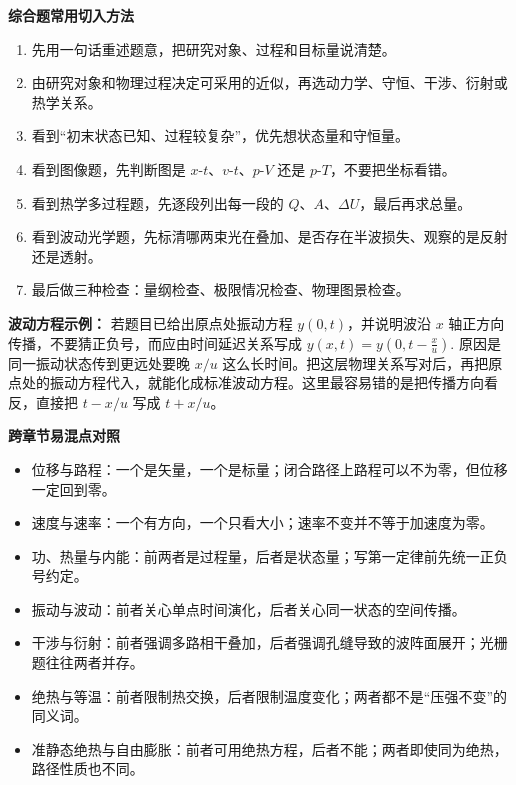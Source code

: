 \documentclass[lang=cn,11pt]{elegantbook}
\begin{document}
\textbf{综合题常用切入方法}

\begin{enumerate}
 \item 先用一句话重述题意，把研究对象、过程和目标量说清楚。
 \item 由研究对象和物理过程决定可采用的近似，再选动力学、守恒、干涉、衍射或热学关系。
 \item 看到“初末状态已知、过程较复杂”，优先想状态量和守恒量。
 \item 看到图像题，先判断图是 \(x\)-\(t\)、\(v\)-\(t\)、\(p\)-\(V\) 还是 \(p\)-\(T\)，不要把坐标看错。
 \item 看到热学多过程题，先逐段列出每一段的 \(Q\)、\(A\)、\(\Delta U\)，最后再求总量。
 \item 看到波动光学题，先标清哪两束光在叠加、是否存在半波损失、观察的是反射还是透射。
 \item 最后做三种检查：量纲检查、极限情况检查、物理图景检查。
\end{enumerate}

\begin{note}
\textbf{波动方程示例：} 若题目已给出原点处振动方程 \(y(0,t)\)，并说明波沿 \(x\) 轴正方向传播，不要猜正负号，而应由时间延迟关系写成
 \(y(x,t)=y\left(0,t-\frac{x}{u}\right).\) 
原因是同一振动状态传到更远处要晚 \(x/u\) 这么长时间。把这层物理关系写对后，再把原点处的振动方程代入，就能化成标准波动方程。这里最容易错的是把传播方向看反，直接把 \(t-x/u\) 写成 \(t+x/u\)。
\end{note}

\textbf{跨章节易混点对照}

\begin{itemize}
 \item 位移与路程：一个是矢量，一个是标量；闭合路径上路程可以不为零，但位移一定回到零。
 \item 速度与速率：一个有方向，一个只看大小；速率不变并不等于加速度为零。
 \item 功、热量与内能：前两者是过程量，后者是状态量；写第一定律前先统一正负号约定。
 \item 振动与波动：前者关心单点时间演化，后者关心同一状态的空间传播。
 \item 干涉与衍射：前者强调多路相干叠加，后者强调孔缝导致的波阵面展开；光栅题往往两者并存。
 \item 绝热与等温：前者限制热交换，后者限制温度变化；两者都不是“压强不变”的同义词。
 \item 准静态绝热与自由膨胀：前者可用绝热方程，后者不能；两者即使同为绝热，路径性质也不同。
\end{itemize}
\end{document}

